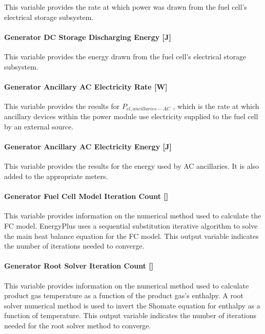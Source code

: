 This variable provides the rate at which power was drawn from the fuel cell's electrical storage subsystem.

\paragraph{Generator DC Storage Discharging Energy {[}J{]}}\label{generator-dc-storage-discharging-energy-j}

This variable provides the energy drawn from the fuel cell's electrical storage subsystem.

\paragraph{Generator Ancillary AC Electricity Rate {[}W{]}}\label{generator-ancillary-ac-electric-power-w}

This variable provides the results for \({P_{el,ancillaries - AC}}\) , which is the rate at which ancillary devices within the power module use electricity supplied to the fuel cell by an external source.

\paragraph{Generator Ancillary AC Electricity Energy {[}J{]}}\label{generator-ancillary-ac-electric-energy-j}

This variable provides the results for the energy used by AC ancillaries. It is also added to the appropriate meters.

\paragraph{Generator Fuel Cell Model Iteration Count {[]}}\label{generator-fuel-cell-model-iteration-count}

This variable provides information on the numerical method used to calculate the FC model. EnergyPlus uses a sequential substitution iterative algorithm to solve the main heat balance equation for the FC model. This output variable indicates the number of iterations needed to converge.

\paragraph{Generator Root Solver Iteration Count {[]}}\label{generator-regula-falsi-iteration-count}

This variable provides information on the numerical method used to calculate product gas temperature as a function of the product gas's enthalpy. A root solver numerical method is used to invert the Shomate equation for enthalpy as a function of temperature. This output variable indicates the number of iterations needed for the root solver method to converge.

